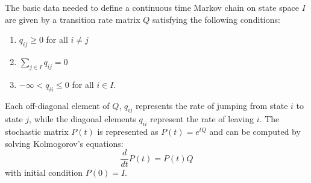 \begin{itemize}
	The basic data needed to define a continuous time Markov chain on state space $I$ are
	given by a transition rate matrix $Q$ satisfying the following conditions:
	
	\begin{enumerate}
		\item $q_{ij} \ge 0$ for all $i \ne j$
		\item $\sum_{j \in I} q_{ij} = 0$
		\item $-\infty < q_{ii} \le 0$ for all $i \in I$.
	\end{enumerate}
	
	Each off-diagonal element of $Q$, $q_{ij}$ represents the rate of jumping from state $i$ to state $j$,
	while the diagonal elements $q_{ii}$ represent the rate of leaving $i$. The stochastic matrix
	$P(t)$ is represented as $P(t) = e^{tQ}$ and can be computed by solving Kolmogorov's equations:
	\begin{equation}
		\frac{d}{dt}P(t) = P(t)Q
	\end{equation}
	with initial condition $P(0) = I$.

\end{itemize}